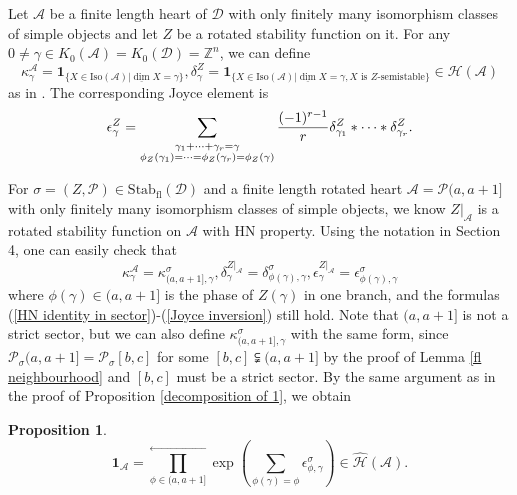 \documentclass[a4paper,12pt]{amsart}
\numberwithin{equation}{section}
\newtheorem{proposition}[theorem]{Proposition}
\newcommand{\Stab}{\mathrm{Stab}}
\newcommand{\udv}{\underline{\dim}}
\newcommand{\Iso}{\mathrm{Iso}}
\newcommand{\1}{\mathbf{1}}
\newcommand{\fl}{\mathrm{fl}}
\begin{document}
Let $\mathcal{A}$ be a finite length heart of $\mathcal{D}$ with only finitely many isomorphism classes of simple objects and let $Z$ be a rotated stability function on it. For any $0\neq\gamma\in K_0(\mathcal{A})=K_0(\mathcal{D})=\mathbb{Z}^n$, we can define
\[\kappa^\mathcal{A}_\gamma=\1_{\{X\in\Iso(\mathcal{A})|\udv X=\gamma\}},\delta^Z_\gamma=\1_{\{X\in\Iso(\mathcal{A})|\udv X=\gamma,X\text{ is $Z$-semistable}\}}\in\mathcal{H}(\mathcal{A})\]
as in \cite{BT2012}. The corresponding Joyce element is
\[\epsilon^Z_\gamma=\sum_{\begin{subarray}{c}
    \\ \gamma_1+\dots+\gamma_r=\gamma\\
   \phi_Z(\gamma_1)=\dots=\phi_Z(\gamma_r)=\phi_Z(\gamma) 
\end{subarray}}\frac{(-1)^{r-1}}{r}\delta^Z_{\gamma_1}*\dots*\delta^Z_{\gamma_r}.\]

For $\sigma=(Z,\mathcal{P})\in\Stab_\fl(\mathcal{D})$ and a finite length rotated heart $\mathcal{A}=\mathcal{P}(a,a+1]$ with only finitely many isomorphism classes of simple objects, we know $Z|_\mathcal{A}$ is a rotated stability function on $\mathcal{A}$ with HN property. Using the notation in Section 4, one can easily check that
\[\kappa^\mathcal{A}_\gamma=\kappa^\sigma_{(a,a+1],\gamma},\delta^{Z|_\mathcal{A}}_\gamma=\delta^\sigma_{\phi(\gamma),\gamma}, \epsilon^{Z|_\mathcal{A}}_{\gamma}=\epsilon^\sigma_{\phi(\gamma),\gamma}\]
where $\phi(\gamma)\in(a,a+1]$ is the phase of $Z(\gamma)$ in one branch, and the formulas (\ref{HN identity in sector})-(\ref{Joyce inversion}) still hold. Note that $(a,a+1]$ is not a strict sector, but we can also define $\kappa^\sigma_{(a,a+1],\gamma}$ with the same form, since $\mathcal{P}_\sigma(a,a+1]=\mathcal{P}_\sigma[b,c]$ for some $[b,c]\subsetneqq(a,a+1]$ by the proof of Lemma \ref{fl neighbourhood} and $[b,c]$ must be a strict sector. By the same argument as in the proof of Proposition \ref{decomposition of 1}, we obtain

\begin{proposition}\label{decomposition of 1,fl}
    \[\1_\mathcal{A}=\prod_{\phi\in(a,a+1]}^\leftarrow\exp\left(\sum_{\phi(\gamma)=\phi}\epsilon^\sigma_{\phi,\gamma}\right)\in\hat{\mathcal{H}}(\mathcal{A}).\]
\end{proposition}
\end{document}
